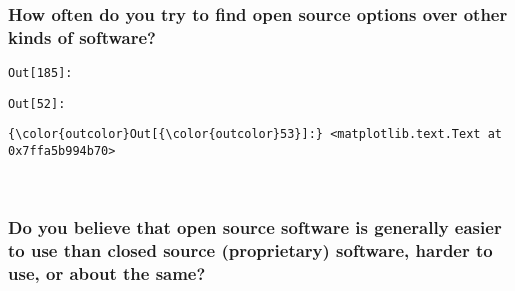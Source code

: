 \documentclass[11pt]{article}
\begin{document}
    \subsubsection{How often do you try to find open source options over
other kinds of
software?}\label{how-often-do-you-try-to-find-open-source-options-over-other-kinds-of-software}

\texttt{\color{outcolor}Out[{\color{outcolor}185}]:}
    

    

\texttt{\color{outcolor}Out[{\color{outcolor}52}]:}
    

    


            \begin{Verbatim}[commandchars=\\\{\}]
{\color{outcolor}Out[{\color{outcolor}53}]:} <matplotlib.text.Text at 0x7ffa5b994b70>
\end{Verbatim}
        
    \begin{center}
    \end{center}
    { \hspace*{\fill} \\}
    
    \subsubsection{Do you believe that open source software is generally
easier to use than closed source (proprietary) software, harder to use,
or about the
same?}\label{do-you-believe-that-open-source-software-is-generally-easier-to-use-than-closed-source-proprietary-software-harder-to-use-or-about-the-same}
\end{document}
